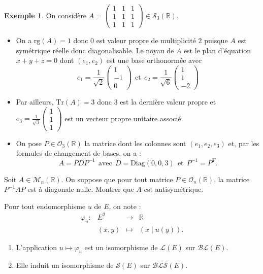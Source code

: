 \documentclass[french]{article}
\newcommand{\R}{\mathbb{R}}
\newcommand{\inv}{^{-1}}
\newcommand{\Tr}{\text{Tr}}
\theoremstyle{plain}
\theoremstyle{definition}
\newtheorem*{ex}{Exemple}
\theoremstyle{remark}
\begin{document}
\begin{ex}
	On considère $A=\displaystyle\begin{pmatrix}
		1&1&1\\
		1&1&1\\
		1&1&1
	\end{pmatrix}\in\mathcal{S}_3(\R)$.
	\begin{itemize}
		\item On a $\text{rg}(A)=1$ donc $0$ est valeur propre de multiplicité $2$ puisque $A$ est symétrique réelle donc diagonalisable. Le noyau de $A$ est le plan d'équation $x+y+z=0$ dont $(e_1,e_2)$ est une base orthonormée avec $$e_1=\frac{1}{\sqrt{2}}\begin{pmatrix}
			1\\
			-1\\
			0
		\end{pmatrix}\ \ \text{et}\ \ e_2=\frac{1}{\sqrt{6}}\begin{pmatrix}
		1\\
		1\\
		-2
		\end{pmatrix}$$
		\item Par ailleurs, $\Tr(A)=3$ donc $3$ est la dernière valeur propre et $e_3=\displaystyle\frac{1}{\sqrt{3}}\begin{pmatrix}
			1\\
			1\\
			1
		\end{pmatrix}$ est un vecteur propre unitaire associé.
		\item On pose $P\in\mathcal{O}_3(\R)$ la matrice dont les colonnes sont $(e_1,e_2,e_3)$ et, par les formules de changement de bases, on a : $$A=PDP\inv\ \ \text{avec}\ \ D=\text{Diag}(0,0,3)\ \ \text{et}\ \ P\inv=P^T.$$
	\end{itemize}
\end{ex}

\begin{exo}
	Soit $A\in\mathcal{M}_n(\R)$. On suppose que pour tout matrice $P\in\mathcal{O}_n(\R)$, la matrice $P\inv AP$ est à diagonale nulle. Montrer que $A$ est antisymétrique.
\end{exo}

\begin{thm}
	Pour tout endomorphisme $u$ de $E$, on note : $$\begin{array}{lrcl}
		\varphi_u:&E^2&\longrightarrow&\R \\
		&(x,y)&\longmapsto&(x\mid u(y)).
	\end{array}$$
	\begin{enumerate}
		\item L'application $u\mapsto\varphi_u$ est un isomorphisme de $\mathcal{L}(E)$ sur $\mathcal{BL}(E)$.
		\item Elle induit un isomorphisme de $\mathcal{S}(E)$ sur $\mathcal{BLS}(E)$.
	\end{enumerate}
\end{thm}
\end{document}
